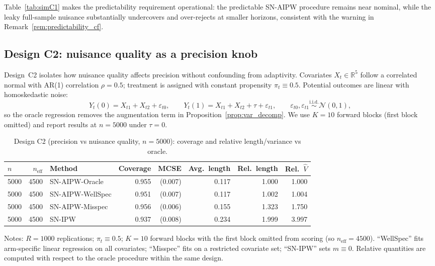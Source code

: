 \documentclass[11pt]{article}
\numberwithin{equation}{section}
\newcommand{\mcse}[1]{{\footnotesize\,(#1)}}
\theoremstyle{plain}
\theoremstyle{definition}
\theoremstyle{remark}
\begin{document}
Table~\ref{tab:simC1} makes the predictability requirement operational: the predictable SN-AIPW procedure remains near nominal, while the leaky full-sample nuisance substantially undercovers and over-rejects at smaller horizons, consistent with the warning in Remark~\ref{rem:predictability_cf}.

\subsection{Design C2: nuisance quality as a precision knob}\label{sec:sim_C2}

Design~C2 isolates how nuisance quality affects precision without confounding from adaptivity. Covariates $X_t\in\mathbb{R}^5$ follow a correlated normal with AR(1) correlation $\rho=0.5$; treatment is assigned with constant propensity $\pi_t\equiv 0.5$. Potential outcomes are linear with homoskedastic noise:
\[
Y_t(0)=X_{t1}+X_{t2}+\varepsilon_{t0},\qquad
Y_t(1)=X_{t1}+X_{t2}+\tau+\varepsilon_{t1},
\qquad \varepsilon_{t0},\varepsilon_{t1}\stackrel{\text{i.i.d.}}{\sim}\mathcal{N}(0,1),
\]
so the oracle regression removes the augmentation term in Proposition~\ref{prop:var_decomp}. We use $K=10$ forward blocks (first block omitted) and report results at $n=5000$ under $\tau=0$.

\begin{table}[!htbp]
\centering
\small
\begin{threeparttable}
\caption{Design C2 (precision vs nuisance quality, $n=5000$): coverage and relative length/variance vs oracle.}
\label{tab:simC2}
\begin{tabular}{@{}l r l r r r r r@{}}
\toprule
{$n$} & {$n_{\mathrm{eff}}$} & {Method} & {Coverage} & {MCSE} & {Avg.\ length} & {Rel.\ length} & {Rel.\ $\widehat V$} \\
\midrule
5000 & 4500 & SN-AIPW-Oracle & 0.955 & \mcse{0.007} & 0.117 & 1.000 & 1.000 \\
5000 & 4500 & SN-AIPW-WellSpec & 0.951 & \mcse{0.007} & 0.117 & 1.002 & 1.004 \\
5000 & 4500 & SN-AIPW-Misspec & 0.956 & \mcse{0.006} & 0.155 & 1.323 & 1.750 \\
5000 & 4500 & SN-IPW & 0.937 & \mcse{0.008} & 0.234 & 1.999 & 3.997 \\
\bottomrule
\end{tabular}
\begin{tablenotes}[flushleft]
\footnotesize
\item Notes: $R=1000$ replications; $\pi_t\equiv 0.5$; $K=10$ forward blocks with the first block omitted from scoring (so $n_{\mathrm{eff}}=4500$). ``WellSpec'' fits arm-specific linear regression on all covariates; ``Misspec'' fits on a restricted covariate set; ``SN-IPW'' sets $m\equiv 0$. Relative quantities are computed with respect to the oracle procedure within the same design.
\end{tablenotes}
\end{threeparttable}
\end{table}
\end{document}
